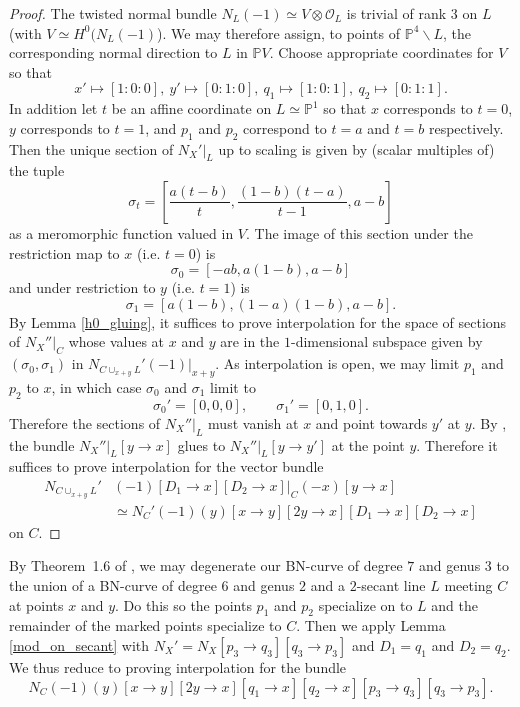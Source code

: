 \documentclass[11pt]{amsart}
\newcommand{\pp}{\mathbb{P}}
\renewcommand{\O}{\mathcal{O}}
\theoremstyle{definition}
\theoremstyle{remark}
\begin{document}
\begin{proof}
The twisted normal bundle $N_L(-1)\simeq V \otimes \O_L$ is trivial of rank $3$ on $L$ (with $V \simeq H^0(N_L(-1)$).  We may therefore assign, to points of $\pp^4 \smallsetminus L$, the corresponding normal direction to $L$ in $\pp V$.
Choose appropriate coordinates for $V$ so that
\[x' \mapsto [1:0:0], \ y' \mapsto [0:1:0], \ q_1 \mapsto [1:0:1], \ q_2 \mapsto [0:1:1].\]
In addition let $t$ be an affine coordinate on $L \simeq \pp^1$ so that $x$ corresponds to $t=0$, $y$ corresponds to $t=1$, and $p_1$ and $p_2$ correspond to $t=a$ and $t=b$ respectively.  Then the unique section of $N_X'|_L$ up to scaling is given by (scalar multiples of) the tuple 
\[ \sigma_t = \left[ \frac{a(t-b)}{t} , \frac{(1 - b)(t-a)}{t-1} , a - b \right] \] 
as a meromorphic function valued in $ V$. 
The image of this section under the restriction map to $x$ (i.e. $t=0$) is
\[\sigma_0 = \left[-ab , a(1 - b) , a - b \right]\]
and under restriction to $y$ (i.e. $t=1$) is
\[\sigma_1 = [a(1-b) , (1-a)(1-b) , a-b]. \]
By Lemma \ref{h0_gluing}, it suffices to prove interpolation for the space of sections of $N_X''|_C$ whose values at $x$ and $y$ are in the $1$-dimensional subspace given by $(\sigma_0,\sigma_1)$ in $ N_{C\cup_{x+y} L}'(-1)|_{x + y}$.  As interpolation is open, we may limit $p_1$ and $p_2$ to $x$, in which case
$\sigma_0$ and $\sigma_1$ limit to
\[ \sigma_0' = [ 0 , 0 , 0], \qquad \sigma_1' = [0,1,0]. \]
Therefore the sections of $N_X''|_L$ must vanish at $x$ and point towards $y'$ at $y$.  By \cite[Lemma 8.4]{joint}, the bundle $N_X''|_L[y \to x]$ glues to $N_X''|_L[y \to y']$ at the point $y$.
Therefore it suffices to prove interpolation for the vector bundle
\begin{align*}
N_{C \cup_{x+y} L}'&(-1)[D_1 \to x][D_2 \to x]|_C(-x)[y \to x] \\
&\simeq N_C'(-1)(y)[x \to y][2y \to x][D_1 \to x][D_2 \to x]
\end{align*}
on $C$.
\end{proof}

By Theorem~1.6 of \cite{rbn}, we may degenerate our BN-curve of degree $7$
and genus $3$ to the union of 
a BN-curve of degree $6$ and genus $2$ and a $2$-secant line $L$ meeting $C$ at points $x$ and $y$.  Do this so the points $p_1$ and $p_2$ specialize on to $L$ and the remainder of the marked points specialize to $C$.  Then we apply Lemma \ref{mod_on_secant} with $N_X' = N_X[p_3 \to q_3][q_3 \to p_3]$ and $D_1=q_1$ and $D_2= q_2$.  We thus reduce to proving interpolation for the bundle
\[N_C(-1)(y)[x \to y][2y \to x][q_1 \to x][q_2 \to x][p_3 \to q_3][q_3 \to p_3].\]
\end{document}

